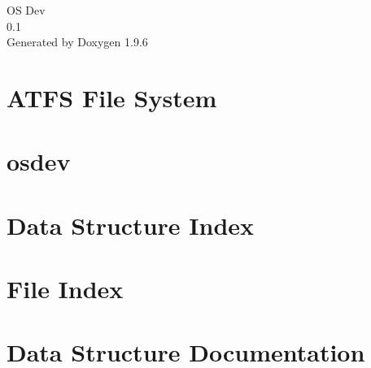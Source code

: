 \documentclass[twoside]{book}
\newcommand{\+}{\discretionary{\mbox{\scriptsize$\hookleftarrow$}}{}{}}
\newcommand{\clearemptydoublepage}{%
    \newpage{\pagestyle{empty}\cleardoublepage}%
  }
\begin{document}
  \raggedbottom
    \hypersetup{pageanchor=false,
                bookmarksnumbered=true,
                pdfencoding=unicode
               }
  \begin{titlepage}
  \vspace*{7cm}
  \begin{center}%
  {\Large OS Dev}\\
  [1ex]\large 0.\+1 \\
  \vspace*{1cm}
  {\large Generated by Doxygen 1.9.6}\\
  \end{center}
  \end{titlepage}
  \clearemptydoublepage
  \tableofcontents
  \clearemptydoublepage
  \hypersetup{pageanchor=true}
\chapter{ATFS File System}
\label{md_atfs_ATFS}

\chapter{osdev}
\label{md_README}

\chapter{Data Structure Index}

\chapter{File Index}

\chapter{Data Structure Documentation}
















\end{document}
